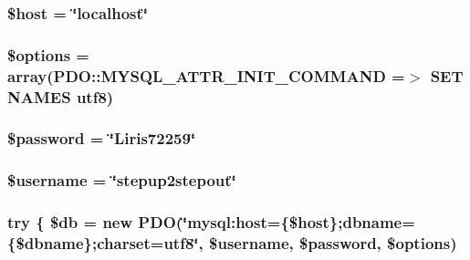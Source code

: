 \subsubsection[{\$host}]{\setlength{\rightskip}{0pt plus 5cm}\$host = \char`\"{}localhost\char`\"{}}\label{config_8php_a711797613cb863ca0756df789c396bf2}
\hypertarget{config_8php_a011800c63ece4cbbfa77136a20607023}{}
\subsubsection[{\$options}]{\setlength{\rightskip}{0pt plus 5cm}\$options = array(P\+D\+O\+::\+M\+Y\+S\+Q\+L\+\_\+\+A\+T\+T\+R\+\_\+\+I\+N\+I\+T\+\_\+\+C\+O\+M\+M\+A\+N\+D =$>$ \textquotesingle{}S\+E\+T N\+A\+M\+E\+S utf8\textquotesingle{})}\label{config_8php_a011800c63ece4cbbfa77136a20607023}
\hypertarget{config_8php_a607686ef9f99ea7c42f4f3dd3dbb2b0d}{}
\subsubsection[{\$password}]{\setlength{\rightskip}{0pt plus 5cm}\$password = \char`\"{}Liris72259\char`\"{}}\label{config_8php_a607686ef9f99ea7c42f4f3dd3dbb2b0d}
\hypertarget{config_8php_a0eb82aa5f81cf845de4b36cd653c42cf}{}
\subsubsection[{\$username}]{\setlength{\rightskip}{0pt plus 5cm}\$username = \char`\"{}stepup2stepout\char`\"{}}\label{config_8php_a0eb82aa5f81cf845de4b36cd653c42cf}
\hypertarget{config_8php_abe4cc9788f52e49485473dc699537388}{}
\subsubsection[{try}]{\setlength{\rightskip}{0pt plus 5cm}try \{ \$db = new P\+D\+O(\char`\"{}mysql\+:host=\{\$host\};dbname=\{\$dbname\};charset=utf8\char`\"{}, \$username, \$password, \$options)}\label{config_8php_abe4cc9788f52e49485473dc699537388}
